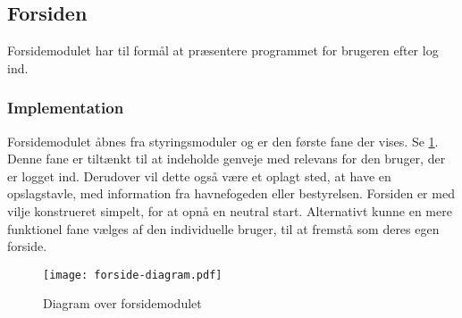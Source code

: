 \subsection{Forsiden}
\label{sub:Welcome}

Forsidemodulet har til formål at præsentere programmet for brugeren efter log ind.

\subsubsection{Implementation}
\label{ssub:Welcome_implementation}
Forsidemodulet åbnes fra styringsmoduler og er den første fane der vises. Se \cref{fig:forsidemod}. Denne fane er tiltænkt til at indeholde genveje med relevans for den bruger, der er logget ind. Derudover vil dette også være et oplagt sted, at have en opslagstavle, med  information fra havnefogeden eller bestyrelsen. Forsiden er med vilje konstrueret simpelt, for at opnå en neutral start. Alternativt kunne en mere funktionel fane vælges af den individuelle bruger, til at fremstå som deres egen forside.

\begin{figure}
  \centering
  \texttt{[image: forside-diagram.pdf]}
  \caption{Diagram over forsidemodulet} \label{fig:forsidemod}
\end{figure}
